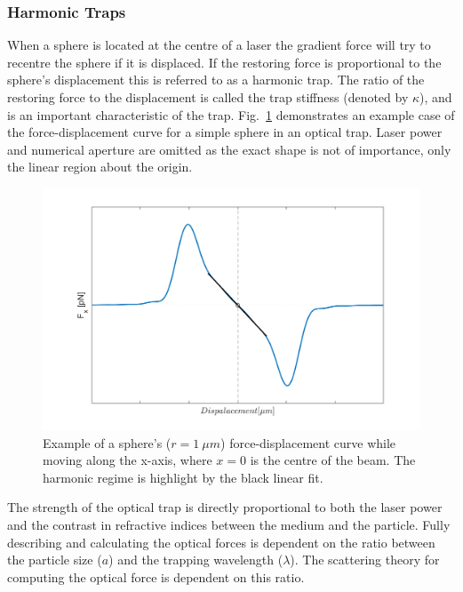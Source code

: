 \subsubsection{Harmonic Traps}
\label{sec:harmonic_traps}
When a sphere is located at the centre of a laser the gradient force
will try to recentre the sphere if it is displaced. If the restoring 
force is proportional to the sphere's displacement this is referred 
to as a harmonic trap. The ratio of the restoring force to the 
displacement is called the trap stiffness (denoted by $\kappa$), and 
is an important characteristic of the trap. Fig.~\ref{fig:harmonic_trap}
demonstrates an example case of the force-displacement curve for a 
simple sphere in an optical trap. Laser power and numerical aperture
are omitted as the exact shape is not of importance, only the linear 
region about the origin.
\begin{figure}[h!]
	\centering
	\includegraphics[width=1.1\linewidth]{sphere_force_curve.png}
	\caption{Example of a sphere's ($r=1\ \mu m$) force-displacement curve 
			while moving along the x-axis, where $x=0$ is the centre of the
			beam. The harmonic regime is highlight by the black linear fit.}
	\label{fig:harmonic_trap}
\end{figure}

The strength of the optical trap is directly proportional to both 
the laser power and the contrast in refractive indices between the 
medium and the particle. Fully describing and calculating the 
optical forces is dependent on the ratio between the particle size 
($a$) and the trapping wavelength ($\lambda$). The scattering theory 
for computing the optical force is dependent on this ratio.  
